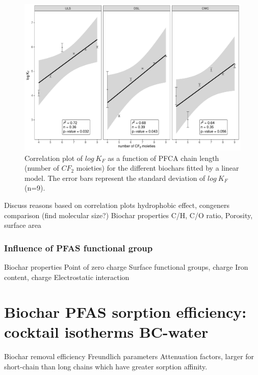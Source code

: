 \begin{figure}
    \centering
    \includegraphics[width=\textwidth]{R/figs/chainlength_KF.pdf}
    \caption{Correlation plot of $log~K_F$ as a function of PFCA chain length (number of $CF_2$ moieties) for the different biochars fitted by a linear model. The error bars represent the standard deviation of $log~ K_F$ (n=9).}
    \label{fig:chainlength}
\end{figure}
 
Discuss reasons based on correlation plots
    hydrophobic effect, congeners comparison
    (find molecular size?)
    Biochar properties
        C/H, C/O ratio, 
        Porosity, surface area

\subsubsection{Influence of PFAS functional group}
Biochar properties
    Point of zero charge
    Surface functional groups, charge
    Iron content, charge
    Electrostatic interaction

\section{Biochar PFAS sorption efficiency: cocktail isotherms BC-water}
Biochar removal efficiency 
Freundlich parameters
Attenuation factors, larger for short-chain than long chains which have greater sorption affinity. 

